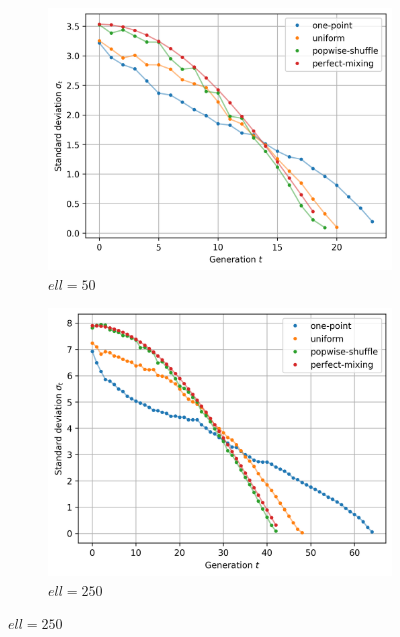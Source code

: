 \documentclass{article}
\begin{document}
\begin{enumerate}[label=(\alph*)]
      \begin{figure}[h]
            \centering
            \begin{subfigure}[b]{0.32\linewidth}
                  \centering
                  \includegraphics[width=\linewidth]{fig-std_50.png}
                  \caption{$ell=50$}
                  \label{fig:std-50}
            \end{subfigure}
            \hfill
            \begin{subfigure}[b]{0.32\linewidth}
                  \centering
                  \includegraphics[width=\linewidth]{fig-std_250.png}
                  \caption{$ell=250$}
                  \label{fig:std-250}

\end{subfigure}
\end{figure}
\end{enumerate}
\end{document}
